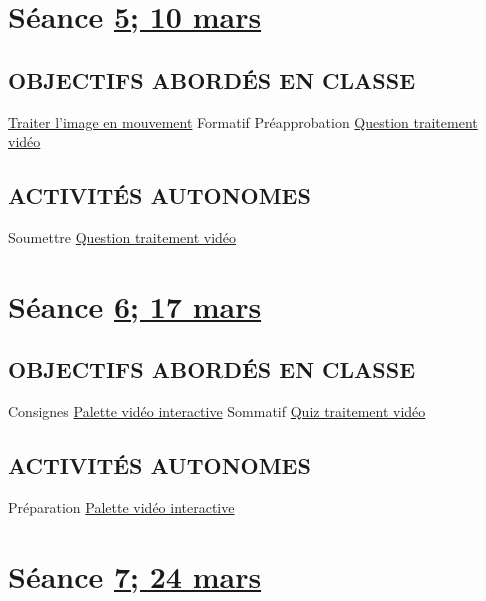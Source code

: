 \documentclass[
  french,
]{book}
\begin{document}
\hypertarget{semaine_6}{%
\section{\texorpdfstring{Séance \protect\hyperlink{semaine_6}{5; 10 mars}}{Séance 5; 10 mars}}\label{semaine_6}}

\hypertarget{objectifs-aborduxe9s-en-classe-5}{%
\subsection{OBJECTIFS ABORDÉS EN CLASSE}\label{objectifs-aborduxe9s-en-classe-5}}

\protect\hyperlink{traiter}{Traiter l'image en mouvement}
Formatif Préapprobation \protect\hyperlink{sommatif_2}{Question traitement vidéo}

\hypertarget{activituxe9s-autonomes-5}{%
\subsection{ACTIVITÉS AUTONOMES}\label{activituxe9s-autonomes-5}}

Soumettre \protect\hyperlink{sommatif_2}{Question traitement vidéo}

\hypertarget{semaine_7}{%
\section{\texorpdfstring{Séance \protect\hyperlink{semaine_7}{6; 17 mars}}{Séance 6; 17 mars}}\label{semaine_7}}

\hypertarget{objectifs-aborduxe9s-en-classe-6}{%
\subsection{OBJECTIFS ABORDÉS EN CLASSE}\label{objectifs-aborduxe9s-en-classe-6}}

Consignes \protect\hyperlink{sommatif_4}{Palette vidéo interactive}
Sommatif \protect\hyperlink{sommatif_3}{Quiz traitement vidéo}

\hypertarget{activituxe9s-autonomes-6}{%
\subsection{ACTIVITÉS AUTONOMES}\label{activituxe9s-autonomes-6}}

Préparation \protect\hyperlink{sommatif_4}{Palette vidéo interactive}

\hypertarget{semaine_8}{%
\section{\texorpdfstring{Séance \protect\hyperlink{semaine_8}{7; 24 mars}}{Séance 7; 24 mars}}\label{semaine_8}}
\end{document}

